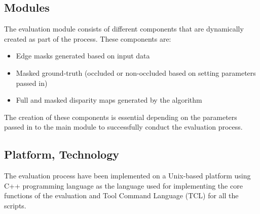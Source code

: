 \subsection{Modules}
The evaluation module consists of different components that are dynamically created as part of the process. These components are:

\begin{itemize}
\item Edge masks generated based on input data 
\item Masked ground-truth (occluded or non-occluded based on setting parameters passed in)
\item Full and masked disparity maps generated by the algorithm 
\end{itemize}

The creation of these components is essential depending on the parameters passed in to the main module to successfully conduct 
the evaluation process.

\subsection{Platform, Technology}
The evaluation process have been implemented on a Unix-based platform using C++ programming language as the language used for implementing 
the core functions of the evaluation and Tool Command Language (TCL) for all the scripts.




